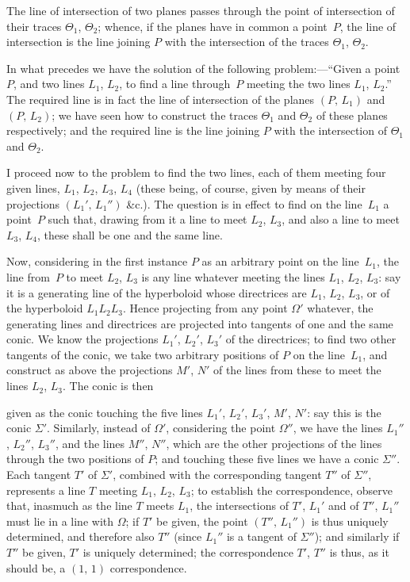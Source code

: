 \documentclass[11pt,a4paper]{article}
\theoremstyle{plain}
\theoremstyle{definition}
\begin{document}
The line of intersection of two planes passes through the point of intersection of
their traces $\Theta_1$, $\Theta_2$; whence, if the planes have in common a point~$P$, the line of
intersection is the line joining $P$ with the intersection of the traces $\Theta_1$, $\Theta_2$.

In what precedes we have the solution of the following problem:---``Given a point
$P$, and two lines $L_1$, $L_2$, to find a line through~$P$ meeting the two lines $L_1$, $L_2$.''  The
required line is in fact the line of intersection of the planes $(P,\,L_1)$ and $(P,\,L_2)$; we
have seen how to construct the traces $\Theta_1$ and $\Theta_2$ of these planes respectively; and
the required line is the line joining $P$ with the intersection of $\Theta_1$ and $\Theta_2$.

I proceed now to the problem to find the two lines, each of them meeting four
given lines, $L_1$, $L_2$, $L_3$, $L_4$ (these being, of course, given by means of their projections
$(L_1',\,L_1'')$ \&c.).  The question is in effect to find on the line~$L_1$ a point~$P$ such that,
drawing from it a line to meet $L_2$, $L_3$, and also a line to meet $L_3$, $L_4$, these shall
be one and the same line.

Now, considering in the first instance $P$ as an arbitrary point on the line~$L_1$,
the line from~$P$ to meet $L_2$, $L_3$ is any line whatever meeting the lines $L_1$, $L_2$, $L_3$:
say it is a generating line of the hyperboloid whose directrices are $L_1$, $L_2$, $L_3$, or of
the hyperboloid $L_1L_2L_3$.  Hence projecting from any point $\Omega'$ whatever, the generating
lines and directrices are projected into tangents of one and the same conic.  We know
the projections $L_1'$, $L_2'$, $L_3'$ of the directrices; to find two other tangents of the conic,
we take two arbitrary positions of $P$ on the line~$L_1$, and construct as above the
projections $M'$, $N'$ of the lines from these to meet the lines $L_2$, $L_3$.  The conic is then

\clearpage

given as the conic touching the five lines $L_1'$, $L_2'$, $L_3'$, $M'$, $N'$: say this is the conic
$\Sigma'$.  Similarly, instead of $\Omega'$, considering the point $\Omega''$, we have the lines $L_1''$, $L_2''$, $L_3''$,
and the lines $M''$, $N''$, which are the other projections of the lines through the two
positions of $P$; and touching these five lines we have a conic $\Sigma''$.  Each tangent $T'$
of $\Sigma'$, combined with the corresponding tangent $T''$ of $\Sigma''$, represents a line $T$ meeting
$L_1$, $L_2$, $L_3$; to establish the correspondence, observe that, inasmuch as the line $T$ meets
$L_1$, the intersections of $T'$, $L_1'$ and of $T''$, $L_1''$ must lie in a line with $\Omega$; if $T'$ be
given, the point $(T'',\,L_1'')$ is thus uniquely determined, and therefore also $T''$ (since $L_1''$
is a tangent of $\Sigma''$); and similarly if $T''$ be given, $T'$ is uniquely determined; the
correspondence $T'$, $T''$ is thus, as it should be, a $(1,\,1)$ correspondence.
\end{document}
